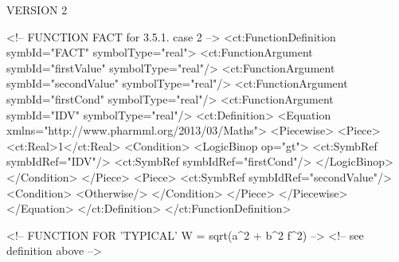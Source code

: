\documentclass[a4paper,10pt]{article}
\begin{document}
VERSION 2
\begin{xmlcode}
<!-- FUNCTION FACT for 3.5.1. case 2 -->
<ct:FunctionDefinition symbId="FACT" symbolType="real">
    <ct:FunctionArgument symbId="firstValue" symbolType="real"/>
    <ct:FunctionArgument symbId="secondValue" symbolType="real"/>
    <ct:FunctionArgument symbId="firstCond" symbolType="real"/>
    <ct:FunctionArgument symbId="IDV" symbolType="real"/>
    <ct:Definition>
        <Equation xmlns="http://www.pharmml.org/2013/03/Maths">
            <Piecewise>
                <Piece>
                    <ct:Real>1</ct:Real>
                    <Condition>
                        <LogicBinop op="gt">
                            <ct:SymbRef symbIdRef="IDV"/>
                            <ct:SymbRef symbIdRef="firstCond"/>
                        </LogicBinop>
                    </Condition>
                </Piece>
                <Piece>
                    <ct:SymbRef symbIdRef="secondValue"/>
                    <Condition>
                        <Otherwise/>
                    </Condition>
                </Piece>
            </Piecewise>
        </Equation>
    </ct:Definition>
</ct:FunctionDefinition>

<!-- FUNCTION FOR 'TYPICAL' W = sqrt(a^2 + b^2 f^2) -->
<!-- see definition above -->


\end{xmlcode}
\end{document}
